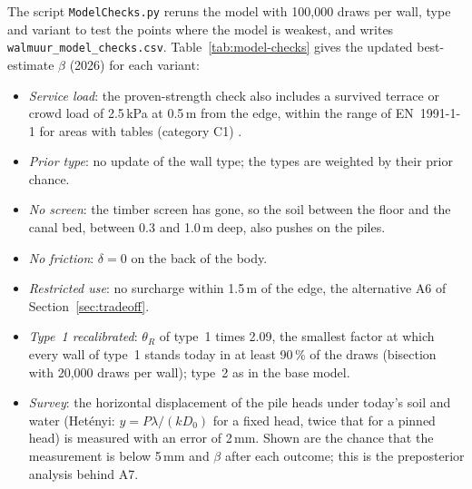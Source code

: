 The script \texttt{ModelChecks.py} reruns the model with 100{,}000 draws per wall,
type and variant to test the points where the model is weakest, and writes
\texttt{walmuur\_model\_checks.csv}. Table~\ref{tab:model-checks} gives the
updated best-estimate $\beta$ (2026) for each variant:
\begin{itemize}
  \item \emph{Service load}: the proven-strength check also includes a
    survived terrace or crowd load of 2.5\,kPa at 0.5\,m from the edge, within
    the range of EN~1991-1-1 for areas with tables (category C1)
    \parencite{en1991}.
  \item \emph{Prior type}: no update of the wall type; the types are weighted
    by their prior chance.
  \item \emph{No screen}: the timber screen has gone, so the soil between the
    floor and the canal bed, between 0.3 and 1.0\,m deep, also pushes on the
    piles.
  \item \emph{No friction}: $\delta = 0$ on the back of the body.
  \item \emph{Restricted use}: no surcharge within 1.5\,m of the edge, the
    alternative A6 of Section~\ref{sec:tradeoff}.
  \item \emph{Type~1 recalibrated}: $\theta_R$ of type~1 times 2.09, the
    smallest factor at which every wall of type~1 stands today in at least
    90\,\% of the draws (bisection with 20{,}000 draws per wall); type~2 as in
    the base model.
  \item \emph{Survey}: the horizontal displacement of the pile heads under
    today's soil and water (Het\'enyi: $y = P\lambda/(kD_0)$ for a fixed head,
    twice that for a pinned head) is measured with an error of 2\,mm. Shown are
    the chance that the measurement is below 5\,mm and $\beta$ after each
    outcome; this is the preposterior analysis behind A7.
\end{itemize}

